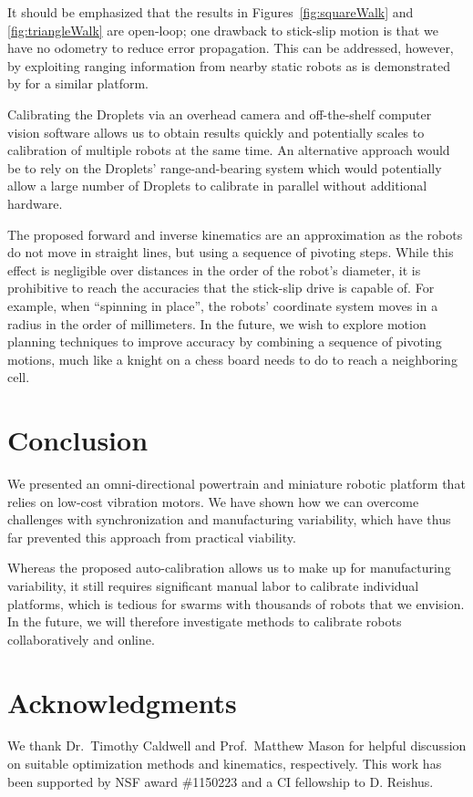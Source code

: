 \documentclass[letterpaper, 10pt, conference]{ieeeconf}
\begin{document}
It should be emphasized that the results in Figures~\ref{fig:squareWalk} and \ref{fig:triangleWalk} are open-loop; one drawback to stick-slip motion is that we have no odometry to reduce error propagation. This can be addressed, however, by exploiting ranging information from nearby static robots as is demonstrated by \cite{rubenstein2012kilobot} for a similar platform.

Calibrating the Droplets via an overhead camera and off-the-shelf computer vision software allows us to obtain results quickly and potentially scales to calibration of multiple robots at the same time. An alternative approach would be to rely on the Droplets' range-and-bearing system \cite{farrow14} which would potentially allow a large number of Droplets to calibrate in parallel without additional hardware. 

The proposed forward and inverse kinematics are an approximation as the robots do not move in straight lines, but using a sequence of pivoting steps. While this effect is negligible over distances in the order of the robot's diameter, it is prohibitive to reach the accuracies that the stick-slip drive is capable of. For example, when ``spinning in place'', the robots' coordinate system moves in a radius in the order of millimeters. In the future, we wish to explore motion planning techniques to improve accuracy by combining a sequence of pivoting motions, much like a knight on a chess board needs to do to reach a neighboring cell. 

\section{Conclusion}
We presented an omni-directional powertrain and miniature robotic platform that relies on low-cost vibration motors. We have shown how we can overcome challenges with synchronization and manufacturing variability, which have thus far prevented this approach from practical viability. 

Whereas the proposed auto-calibration allows us to make up for manufacturing variability, it still requires significant manual labor to calibrate individual platforms, which is tedious for swarms with thousands of robots that we envision. In the future, we will therefore investigate methods to calibrate robots collaboratively and online.  

\section*{Acknowledgments} We thank Dr.\ Timothy Caldwell and Prof.\ Matthew Mason for helpful discussion on suitable optimization methods and kinematics, respectively.   
This work has been supported by NSF award \#1150223 and a CI fellowship to D. Reishus.




\end{document}
